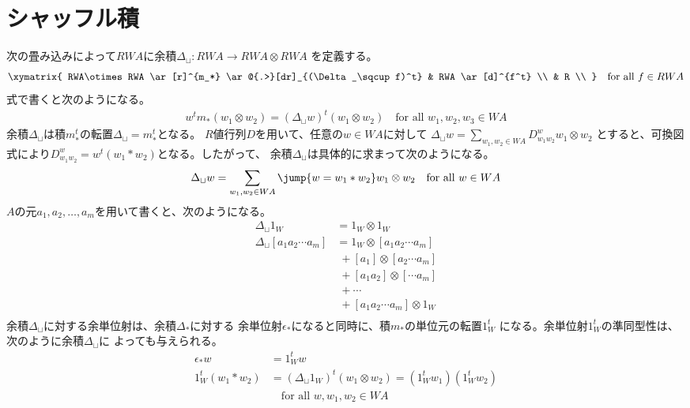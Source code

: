 \section{シャッフル積}\label{s1:シャッフル積} %
	次の畳み込みによって$RWA$に余積$\Delta_\sqcup:RWA\to RWA\otimes RWA$
	を定義する。
	\begin{equation}\label{eq:シャッフル余積の可換図その一}\begin{split} %
		\xymatrix{
			RWA\otimes RWA \ar[r]^{m_*} \ar@{.>}[dr]_{(\Delta_\sqcup f)^t} 
			& RWA \ar[d]^{f^t} \\
			& R \\
		} \quad\text{for all }f\in RWA
	\end{split}\end{equation} %
	式で書くと次のようになる。
	\begin{equation*}\begin{split} %
		w^tm_*(w_1\otimes w_2) = (\Delta_\sqcup w)^t(w_1\otimes w_2)
		\quad\text{for all }w_1,w_2,w_3\in WA
	\end{split}\end{equation*} %
	余積$\Delta_\sqcup$は積$m_*^t$の転置$\Delta_\sqcup=m_*^t$となる。
	$R$値行列$D$を用いて、任意の$w\in WA$に対して
	$\Delta_\sqcup w=\sum_{w_1,w_2\in WA}D_{w_1w_2}^ww_1\otimes w_2$
	とすると、可換図式により$D_{w_1w_2}^w=w^t(w_1*w_2)$となる。したがって、
	余積$\Delta_\sqcup$は具体的に求まって次のようになる。
	\begin{equation*}\begin{split} %
		\Delta_\sqcup w = \sum_{w_1,w_2\in WA}\jump{w=w_1*w_2}w_1\otimes w_2
		\quad\text{for all }w\in WA
	\end{split}\end{equation*} %
	$A$の元$a_1,a_2,\dots,a_m$を用いて書くと、次のようになる。
	\begin{equation*}\begin{split} %
		\Delta_\sqcup1_W &= 1_W\otimes 1_W \\
		\Delta_\sqcup[a_1a_2\cdots a_m] &= 1_W\otimes [a_1a_2\cdots a_m] \\
		&\;+ [a_1]\otimes [a_2\cdots a_m] \\
		&\;+ [a_1a_2]\otimes [\cdots a_m] \\
		&\;+ \cdots \\
		&\;+ [a_1a_2\cdots a_m]\otimes 1_W \\
	\end{split}\end{equation*} %
	余積$\Delta_\sqcup$に対する余単位射は、余積$\Delta_*$に対する
	余単位射$\epsilon_*$になると同時に、積$m_*$の単位元の転置$1_W^t$
	になる。余単位射$1_W^t$の準同型性は、次のように余積$\Delta_\sqcup$に
	よっても与えられる。
	\begin{equation*}\begin{split} %
		\epsilon_*w &= 1_W^tw \\
		1_W^t(w_1*w_2) &= (\Delta_\sqcup 1_W)^t(w_1\otimes w_2)
			= (1_W^tw_1)(1_W^tw_2) \\
		&\quad\text{for all }w,w_1,w_2\in WA \\
	\end{split}\end{equation*} %

